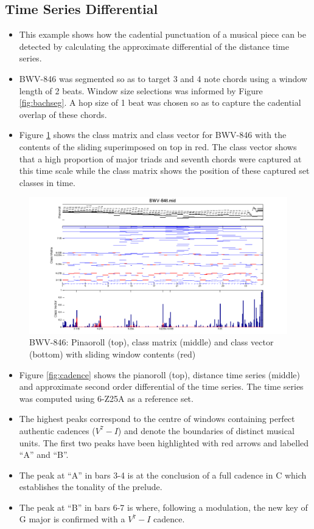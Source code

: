 \documentclass{article}
\begin{document}
\subsection{Time Series Differential}
\label{sec-8-3}

\begin{itemize}
\item This example shows how the cadential punctuation of a musical piece
  can be detected by calculating the approximate differential of the
  distance time series.
\item BWV-846 was segmented so as to target 3 and 4 note chords using a
  window length of 2 beats. Window size selections was informed by
  Figure \ref{fig:bachseg}. A hop size of 1 beat was chosen so
  as to capture the cadential overlap of these chords.
\item Figure \ref{fig:BWV-846-red} shows the class matrix and class vector
  for BWV-846 with the contents of the sliding superimposed on top in
  red. The class vector shows that a high proportion of major triads
  and seventh chords were captured at this time scale while the class
  matrix shows the position of these captured set classes in time.
\end{itemize}
\begin{figure}[htb]
\centering
\includegraphics[width=.8\linewidth]{./plots/BWV-846-red.png}
\caption{\label{fig:BWV-846-red}BWV-846: Pinaoroll (top), class matrix (middle) and class vector (bottom) with sliding window contents (red)}
\end{figure}
\begin{itemize}
\item Figure \ref{fig:cadence} shows the pianoroll (top), distance time
  series (middle) and approximate second order differential of the
  time series. The time series was computed using 6-Z25A as a
  reference set.
\item The highest peaks correspond to the centre of windows containing
  perfect authentic cadences ($V^{7}-I$) and denote the boundaries of
  distinct musical units. The first two peaks have been highlighted
  with red arrows and labelled ``A'' and ``B''.
\item The peak at ``A'' in bars 3-4 is at the conclusion of a
  full cadence in C which establishes the tonality of the prelude.
\item The peak at ``B'' in bars 6-7 is where, following a modulation, the
  new key of G major is confirmed with a $V^{7}-I$ cadence.
\end{itemize}
\end{document}
